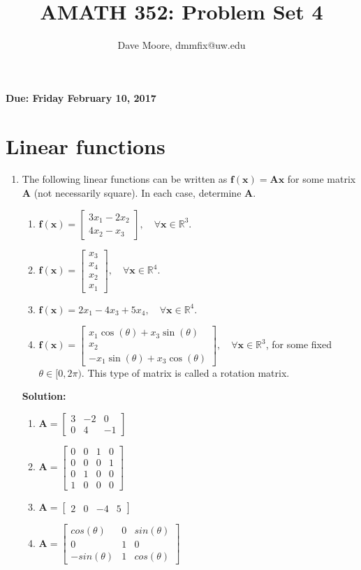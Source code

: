 \documentclass[]{article}
\title{AMATH 352: Problem Set 4}
\author{Dave Moore, dmmfix@uw.edu}
\newcommand{\R}{\mathbb{R}}				%
\newcommand{\bbm}{\begin{bmatrix}}		%
\newcommand{\ebm}{\end{bmatrix}}		%
\newcommand{\x}{\bm{x}}					%
\newcommand{\A}{\bm{A}}					%
\newcommand{\solution}{\vskip 0.5cm \textbf{\large Solution:} \\}
\begin{document}
\maketitle
    {\Large \textbf{Due: Friday February 10, 2017}} \\

    \vskip 1cm

    \section*{Linear functions}
    \begin{enumerate}
	\item The following linear functions can be written as $\bm{f}(\x)=\A\x$ for some matrix $\A$ (not necessarily square). In each case, determine $\A$.
	  \begin{enumerate}
	  \item $\bm{f}(\x) = \bbm 3x_1-2x_2\\4x_2-x_3 \ebm,\quad\forall\x\in\R^3$.
	  \item $\bm{f}(\x) = \bbm x_3\\x_4\\x_2\\x_1 \ebm,\quad\forall\x\in\R^4$.
	  \item $\bm{f}(\x) = 2x_1-4x_3+5x_4,\quad\forall\x\in\R^4$.
	  \item $\bm{f}(\x) = \bbm x_1\cos(\theta)+x_3\sin(\theta)\\x_2\\-x_1\sin(\theta)+x_3\cos(\theta) \ebm,\quad\forall\x\in\R^3$, for some fixed\\ $\theta\in[0,2\pi)$. This type of matrix is called a rotation matrix.
	  \end{enumerate}

	  \solution
	  \begin{enumerate}
	  \item $\bm{A} = \bbm 3 & -2 & 0 \\ 0 & 4 & -1 \ebm$
	  \item $\bm{A} = \bbm 0 & 0 & 1 & 0 \\ 0 & 0 & 0 & 1 \\ 0 & 1 & 0 & 0 \\ 1 & 0 & 0 & 0 \ebm$
	  \item $\bm{A} = \bbm 2 & 0 & -4 & 5 \ebm$
	  \item $\bm{A} = \bbm cos(\theta) & 0 & sin(\theta) \\ 0 & 1 & 0 \\ -sin(\theta) & 1 & cos(\theta) \ebm$
	  \end{enumerate}
    \end{enumerate}
\end{document}
